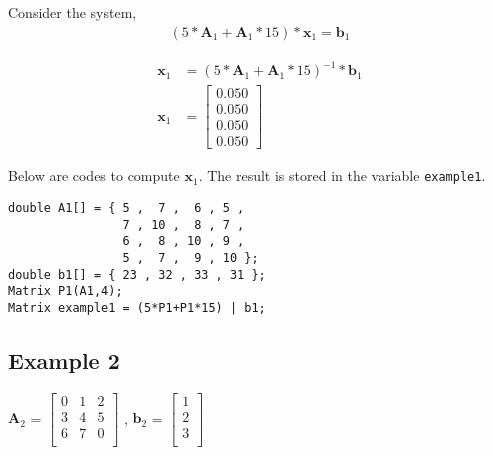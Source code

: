 \documentclass[a4paper]{article}
\begin{document}
Consider the system,
\begin{equation*}
\begin{aligned}
\left(5*\boldsymbol{A}_{1}+\boldsymbol{A}_{1}*15\right)  * \boldsymbol{x}_{1}  = \boldsymbol{b}_{1}
\end{aligned}
\end{equation*}





\begin{equation*}
\begin{aligned}
\boldsymbol{x}_{1}  &= \left(5*\boldsymbol{A}_{1}+\boldsymbol{A}_{1}*15\right)^{-1} * \boldsymbol{b}_{1} \\
\boldsymbol{x}_{1}  &= 
\begin{bmatrix} 
		0.050 \\
		0.050 \\
		0.050 \\
		0.050
\end{bmatrix}
\end{aligned}
\end{equation*}



Below are codes to compute $\boldsymbol{x}_{1}$. The result is stored in the variable \texttt{example1}.
\begin{verbatim} 
double A1[] = { 5 ,  7 ,  6 , 5 ,
                7 , 10 ,  8 , 7 ,
                6 ,  8 , 10 , 9 ,
                5 ,  7 ,  9 , 10 };
double b1[] = { 23 , 32 , 33 , 31 };
Matrix P1(A1,4);   
Matrix example1 = (5*P1+P1*15) | b1;  
\end{verbatim}



\subsection{Example 2}


$\boldsymbol{A}_{2}$ = $\begin{bmatrix}
0 & 1 & 2 \\
3 & 4 & 5 \\ 
6 & 7 & 0 \\
\end{bmatrix}$ \hspace{0.5cm} , \hspace{0.5cm} 
$\boldsymbol{b}_{2}$ = $\begin{bmatrix}
1 \\ 
2 \\
3 \\ 
\end{bmatrix}$
\end{document}
